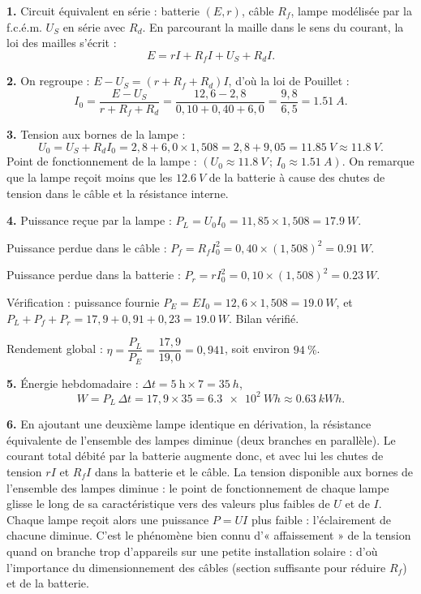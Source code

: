 \documentclass[11pt]{article}
\begin{document}
\begin{corrige}
\textbf{1.} Circuit équivalent en série : batterie $(E, r)$, câble $R_f$, lampe modélisée par la f.c.é.m. $U_S$ en série avec $R_d$. En parcourant la maille dans le sens du courant, la loi des mailles s'écrit :
\[ E = rI + R_f I + U_S + R_d I. \]

\textbf{2.} On regroupe : $E - U_S = (r + R_f + R_d) I$, d'où la loi de Pouillet :
\[ I_0 = \frac{E - U_S}{r + R_f + R_d} = \frac{12,6 - 2,8}{0,10 + 0,40 + 6,0} = \frac{9,8}{6,5} = \SI{1,51}{A}. \]

\textbf{3.} Tension aux bornes de la lampe :
\[ U_0 = U_S + R_d I_0 = 2,8 + 6,0 \times 1,508 = 2,8 + 9,05 = \SI{11,85}{V} \approx \SI{11,8}{V}. \]
Point de fonctionnement de la lampe : $(U_0 \approx \SI{11,8}{V}\,;\, I_0 \approx \SI{1,51}{A})$. On remarque que la lampe reçoit moins que les $\SI{12,6}{V}$ de la batterie à cause des chutes de tension dans le câble et la résistance interne.

\textbf{4.} Puissance reçue par la lampe : $P_L = U_0 I_0 = 11,85 \times 1,508 = \SI{17,9}{W}$.

Puissance perdue dans le câble : $P_f = R_f I_0^2 = 0,40 \times (1,508)^2 = \SI{0,91}{W}$.

Puissance perdue dans la batterie : $P_r = r I_0^2 = 0,10 \times (1,508)^2 = \SI{0,23}{W}$.

Vérification : puissance fournie $P_E = E I_0 = 12,6 \times 1,508 = \SI{19,0}{W}$, et $P_L + P_f + P_r = 17,9 + 0,91 + 0,23 = \SI{19,0}{W}$. Bilan vérifié.

Rendement global : $\eta = \dfrac{P_L}{P_E} = \dfrac{17,9}{19,0} = 0,941$, soit environ $94~\%$.

\textbf{5.} Énergie hebdomadaire : $\Delta t = 5~\text{h} \times 7 = \SI{35}{h}$,
\[ W = P_L \, \Delta t = 17,9 \times 35 = \SI{6,3e2}{Wh} \approx \SI{0,63}{kWh}. \]

\textbf{6.} En ajoutant une deuxième lampe identique en dérivation, la résistance équivalente de l'ensemble des lampes diminue (deux branches en parallèle). Le courant total débité par la batterie augmente donc, et avec lui les chutes de tension $rI$ et $R_f I$ dans la batterie et le câble. La tension disponible aux bornes de l'ensemble des lampes diminue : le point de fonctionnement de chaque lampe glisse le long de sa caractéristique vers des valeurs plus faibles de $U$ et de $I$. Chaque lampe reçoit alors une puissance $P = UI$ plus faible : l'éclairement de chacune diminue. C'est le phénomène bien connu d'« affaissement » de la tension quand on branche trop d'appareils sur une petite installation solaire : d'où l'importance du dimensionnement des câbles (section suffisante pour réduire $R_f$) et de la batterie.
\end{corrige}
\end{document}
